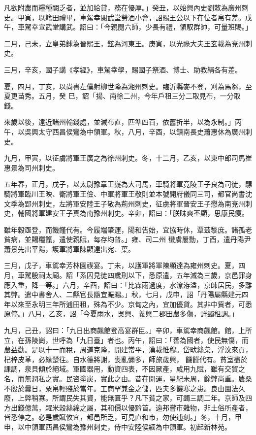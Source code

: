 \begin{pinyinscope}
 凡欲附農而糧種闕乏者，並加給貸，務在優厚。」癸丑，以始興內史劉敕為廣州刺史。甲寅，以籍田禮畢，車駕幸閱武堂勞酒小會，詔賜王公以下在位者帛有差。戊午，車駕幸宣武堂講武。詔曰：「今親閱六師，少長有禮，領馭群帥，可量班賜。」



 二月，己未，立皇弟銶為晉熙王，鉉為河東王。庚寅，以光祿大夫王玄載為兗州刺史。



 三月，辛亥，國子講《孝經》，車駕幸學，賜國子祭酒、博士、助教絹各有差。



 夏，四月，丁亥，以尚書左僕射柳世隆為湘州刺史。臨沂縣麥不登，刈為馬芻，至夏更苗秀。五月，癸
 巳，詔「揚、南徐二州，今年戶租三分二取見布，一分取錢。



 來歲以後，遠近諸州輸錢處，並減布直，匹準四百，依舊折半，以為永制。」丙午，以吳興太守西昌侯鸞為中領軍。秋，八月，辛酉，以鎮南長史蕭惠休為廣州刺史。



 九月，甲寅，以征虜將軍王廣之為徐州刺史。冬，十二月，乙亥，以東中郎司馬崔惠景為司州刺史。



 五年春，正月，戊子，以太尉豫章王嶷為大司馬，車騎將軍竟陵王子良為司徒，驃騎將軍臨川王映、衛將軍王儉、中軍將軍王敬則並本號開府儀同三司，都官尚書沈文季為郢州刺史，左將軍安陸王子敬為荊州刺史，征虜將軍晉安王子懋為南兗州刺史，輔國將軍建安王子真為南豫州刺史。辛卯，詔曰：「朕昧爽丕顯，思康民瘼。



 雖年穀亟登，而饑饉代有。今履端肇運，陽和告始，宜協時休，覃茲黎庶。諸孤老貧病，並賜糧餼，遣使親賦，每存均普。」雍、司二州
 蠻虜屢動，丁酉，遣丹陽尹蕭景先出平陽，護軍將軍陳顯達出宛、葉。



 三月，戊子，車駕幸芳林園禊宴。丁未，以護軍將軍陳顯達為雍州刺史。夏，四月，車駕殷祠太廟。詔「系囚見徒四歲刑以下，悉原遣，五年減為三歲，京邑罪身應入重，降一等。」六月，辛酉，詔曰：「比霖雨過度，水潦洊溢，京師居民，多離其弊。遣中書舍人、二縣官長隨宜賑賜。」秋，七月，戊申，詔「丹陽屬縣建元四年以來至永明三年所逋田租，殊為不少。京甸之內，宜加優貸。其非中貲者，可悉原停。」八月，乙亥，詔「今夏雨水，吳興、義興二郡田農多傷，詳蠲租調。」



 九月，己丑，詔曰：「九日出商飆館登高宴群臣。」辛卯，車駕幸商飆館。館，上所立，在孫陵崗，世呼為「九日臺」者也。丙午，詔曰：「善為國者，使民無傷，而農益勸。是以十一而稅，周道克隆，開建常平，漢載惟穆。岱畎絲枲，浮汶來貢，杞梓皮革，必緣楚往。自水德將謝，喪亂彌多，師旅歲興，
 饑饉代有。貧室盡於課調，泉貝傾於絕域。軍國器用，動資四表，不因厥產，咸用九賦，雖有交貿之名，而無潤私之實。民咨塗炭，實此之由。昔在開運，星紀未周，餘弊尚重。農桑不殷於曩日，粟帛輕賤於當年。工商罕兼金之儲，匹夫多饑寒之患。良由圜法久廢，上弊稍寡。所謂民失其資，能無匱乎？凡下貧之家，可蠲三調二年。京師及四方出錢億萬，糴米穀絲綿之屬，其和價以優黔首。遠邦嘗市雜物，非土俗所產者，皆悉停之。必是歲賦攸宜，都邑所乏，可見直和市，勿使逋刻。」冬，十月，甲申，以中領軍西昌侯鸞為豫州刺史，侍中安陸侯緬為中領軍。初起新林苑。




\end{pinyinscope}
